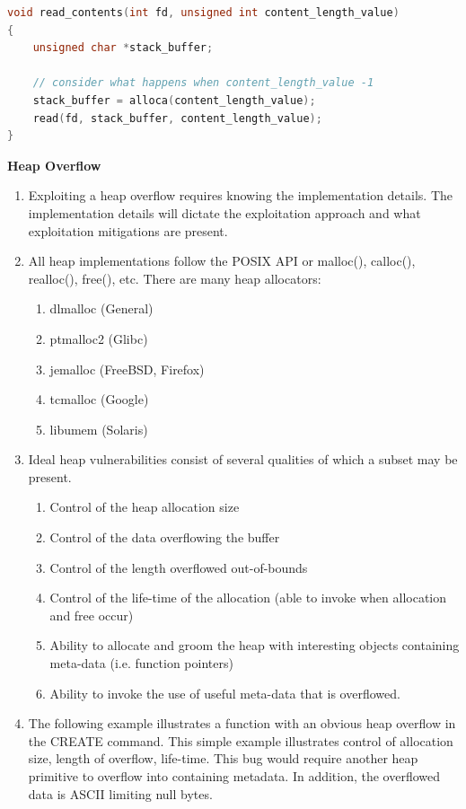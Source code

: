 \documentclass[12pt]{Training}
\begin{document}
\begin{sectionbox}
\begin{lstlisting}[language=C, caption={Stack Corruption}]
void read_contents(int fd, unsigned int content_length_value)
{
	unsigned char *stack_buffer;

	// consider what happens when content_length_value -1
	stack_buffer = alloca(content_length_value);
	read(fd, stack_buffer, content_length_value);
}
\end{lstlisting}
\end{sectionbox}

\textbf{Heap Overflow}
\begin{enumerate}
  \item Exploiting a heap overflow requires knowing the implementation details. The implementation details will dictate the exploitation approach and what exploitation mitigations are present.
  \item All heap implementations follow the POSIX API or malloc(), calloc(), realloc(), free(), etc.  There are many heap allocators:
    \begin{enumerate}
      \item dlmalloc (General)
      \item ptmalloc2 (Glibc)
      \item jemalloc (FreeBSD, Firefox)
      \item tcmalloc (Google)
      \item libumem (Solaris)
    \end{enumerate}
  \item Ideal heap vulnerabilities consist of several qualities of which a subset may be present.
    \begin{enumerate}
      \item Control of the heap allocation size
      \item Control of the data overflowing the buffer
      \item Control of the length overflowed out-of-bounds
      \item Control of the life-time of the allocation (able to invoke when allocation and free occur)
      \item Ability to allocate and groom the heap with interesting objects containing meta-data (i.e. function pointers)
      \item Ability to invoke the use of useful meta-data that is overflowed.
    \end{enumerate}
  \item The following example illustrates a function with an obvious heap overflow in the CREATE command. This simple example illustrates control of allocation size, length of overflow, life-time. This bug would require another heap primitive to overflow into containing metadata. In addition, the overflowed data is ASCII limiting null bytes.
\end{enumerate}
\end{document}
